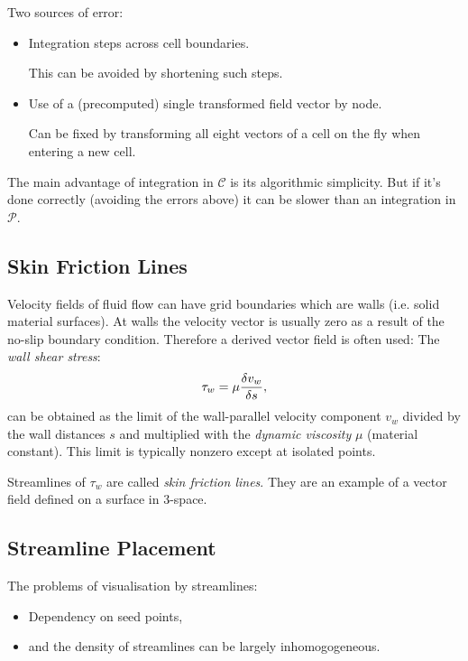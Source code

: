 Two sources of error:
\begin{itemize}
    \item Integration steps across cell boundaries.
    
    This can be avoided by shortening such steps.
    
    \item Use of a (precomputed) single transformed field vector by node. 
    
    Can be fixed by transforming all eight vectors of a cell on the fly when entering a new cell.
\end{itemize}

The main advantage of integration in $\mathcal C$ is its algorithmic simplicity. But if it's done correctly (avoiding the errors above) it can be slower than an integration in $\mathcal P$.

\subsection{Skin Friction Lines}
Velocity fields of fluid flow can have grid boundaries which are walls (i.e. solid material surfaces). At walls the velocity vector is usually zero as a result of the no-slip boundary condition.
Therefore a derived vector field is often used: The \emph{wall shear stress}:
\begin{align*}
    \tau_w = \mu{\delta v_w\over \delta s},
\end{align*}
can be obtained as the limit of the wall-parallel velocity component $v_w$ divided by the wall distances $s$ and multiplied with the \emph{dynamic viscosity} $\mu$ (material constant). This limit is typically nonzero except at isolated points.

Streamlines of $\tau_w$ are called \emph{skin friction lines}. They are an example of a vector field defined on a surface in $3$-space.

\subsection{Streamline Placement}
The problems of visualisation by streamlines:
\begin{itemize}
    \item Dependency on seed points,
    \item and the density of streamlines can be largely inhomogogeneous.
\end{itemize}

